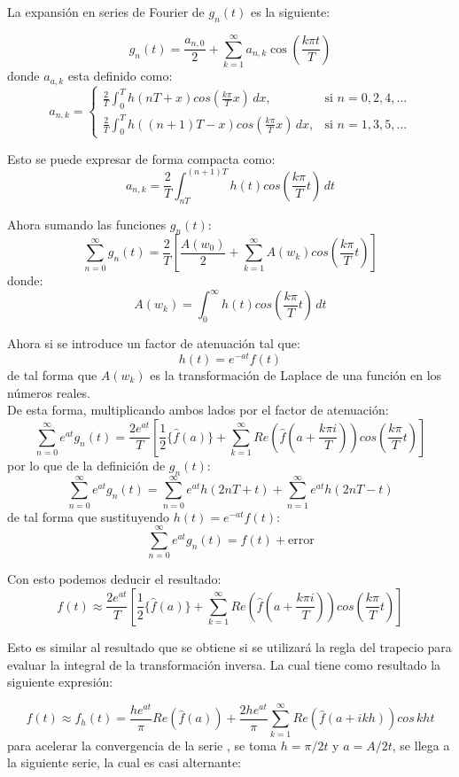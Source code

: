 \documentclass[11pt]{article}
\numberwithin{equation}{section} %
\begin{document}
La expansión en series de Fourier de $g_n(t)$ es la siguiente:

\[
g_n(t)=\frac{a_{n,0}}{2}+\sum_{k=1}^{\infty}a_{n,k}\cos\left(\frac{k\pi t}{T}\right)
\]
donde $a_{a,k}$ esta definido como:
\[
a_{n,k} =
\begin{cases}
\displaystyle \frac{2}{T}\int_0^T h(nT+x)cos\left(\frac{k\pi}{T}x\right)\,dx, & \mbox{si } n=0,2,4,\ldots \\
\displaystyle \frac{2}{T}\int_0^T h((n+1)T-x)cos\left(\frac{k\pi}{T}x\right)\,dx, & \mbox{si } n=1,3,5,\ldots
\end{cases}
\]

Esto se puede expresar de forma compacta como:
\[
a_{n,k}=\frac{2}{T}\int_{nT}^{(n+1)T} h(t)cos\left(\frac{k\pi}{T}t\right)\,dt
\]

Ahora sumando las funciones $g_n(t)$:
\[
\sum_{n=0}^{\infty}g_n(t)=\frac{2}{T}\left[\frac{A(w_0)}{2}+\sum_{k=1}^{\infty}A(w_k)cos\left(\frac{k\pi}{T}t\right)\right]
\]
donde:
\[
A(w_k)=\int_0^\infty h(t)cos\left(\frac{k\pi}{T}t\right)\,dt
\]

Ahora si se introduce un factor de atenuación tal que:
\[
h(t)=e^{-at}f(t)
\]
de tal forma que $A(w_k)$ es la transformación de Laplace de una función en los números reales.\\

De esta forma, multiplicando ambos lados por el factor de atenuación:
\[
\sum_{n=0}^{\infty}e^{at}g_n(t)=\frac{2e^{at}}{T}\left[\frac{1}{2} \{\hat{f}(a) \}+\sum_{k=1}^{\infty}Re\left(\hat{f}\left(a+\frac{k\pi i}{T}\right)\right)cos\left(\frac{k\pi}{T}t\right)\right]
\]
por lo que de la definición de $g_n(t)$:
\[
\sum_{n=0}^{\infty}e^{at}g_n(t)=\sum_{n=0}^{\infty}e^{at}h(2nT+t)+\sum_{n=1}^{\infty}e^{at}h(2nT-t)
\]
de tal forma que sustituyendo $h(t)=e^{-at}f(t)$:
\[
\sum_{n=0}^{\infty}e^{at}g_n(t) = f(t) + \text{error}
\]

Con esto podemos deducir el resultado:
\begin{equation}
f(t) \approx \frac{2e^{at}}{T}\left[\frac{1}{2} \{\hat{f}(a) \}+\sum_{k=1}^{\infty}Re\left(\hat{f}\left(a+\frac{k\pi i}{T}\right)\right)cos\left(\frac{k\pi}{T}t\right)\right]
\end{equation}

Esto es similar al resultado que se obtiene si se utilizará la regla del trapecio para evaluar la integral de la transformación inversa. La cual tiene como resultado la siguiente expresión:

\[
f(t)\approx f_h(t)=\frac{he^{at}}{\pi} Re(\hat{f}(a))+\frac{2he^{at}}{\pi}\sum_{k=1}^{\infty}Re(\hat{f}(a+ikh))cos\,kht
\]
para acelerar la convergencia de la serie \cite{abate1995}, se toma $h=\pi/2t$ y $a=A/2t$, se llega a la siguiente serie, la cual es casi alternante:
\end{document}
